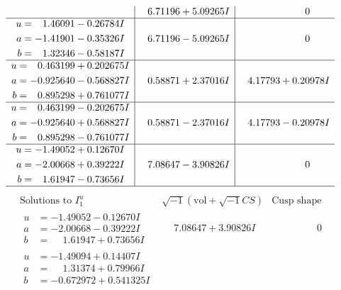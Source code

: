 \documentclass[1p]{elsarticle_modified}
\theoremstyle{definition}
\newcommand{\I}{\sqrt{-1}}
\begin{document}
$$\begin{array}{c|c|c}
 & \phantom{-}6.71196 + 5.09265 I & \phantom{-0.000000 } 0 \\ \hline\begin{aligned}
u &= \phantom{-}1.46091 - 0.26784 I \\
a &= -1.41901 - 0.35326 I \\
b &= \phantom{-}1.32346 - 0.58187 I\end{aligned}
 & \phantom{-}6.71196 - 5.09265 I & \phantom{-0.000000 } 0 \\ \hline\begin{aligned}
u &= \phantom{-}0.463199 + 0.202675 I \\
a &= -0.925640 - 0.568827 I \\
b &= \phantom{-}0.895298 + 0.761077 I\end{aligned}
 & \phantom{-}0.58871 + 2.37016 I & \phantom{-}4.17793 + 0.20978 I \\ \hline\begin{aligned}
u &= \phantom{-}0.463199 - 0.202675 I \\
a &= -0.925640 + 0.568827 I \\
b &= \phantom{-}0.895298 - 0.761077 I\end{aligned}
 & \phantom{-}0.58871 - 2.37016 I & \phantom{-}4.17793 - 0.20978 I \\ \hline\begin{aligned}
u &= -1.49052 + 0.12670 I \\
a &= -2.00668 + 0.39222 I \\
b &= \phantom{-}1.61947 - 0.73656 I\end{aligned}
 & \phantom{-}7.08647 - 3.90826 I & \phantom{-0.000000 } 0\\
 \hline 
 \end{array}$$\newpage$$\begin{array}{c|c|c}  
\text{Solutions to }I^u_{1}& \I (\text{vol} + \sqrt{-1}CS) & \text{Cusp shape}\\
 \hline 
\begin{aligned}
u &= -1.49052 - 0.12670 I \\
a &= -2.00668 - 0.39222 I \\
b &= \phantom{-}1.61947 + 0.73656 I\end{aligned}
 & \phantom{-}7.08647 + 3.90826 I & \phantom{-0.000000 } 0 \\ \hline\begin{aligned}
u &= -1.49094 + 0.14407 I \\
a &= \phantom{-}1.31374 + 0.79966 I \\
b &= -0.672972 + 0.541325 I\end{aligned}

\end{array}$$
\end{document}
